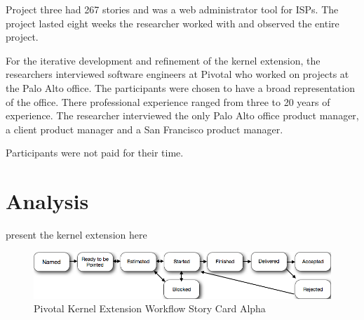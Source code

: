 \documentclass[preprint,12pt,3p]{elsarticle}
\begin{document}
Project three had 267 stories and was a web administrator tool for ISPs. The project lasted eight weeks the researcher worked with and observed the entire project.

For the iterative development and refinement of the kernel extension, the researchers interviewed software engineers at Pivotal who worked on projects at the Palo Alto office. The participants were chosen to have a broad representation of the office. There professional experience ranged from three to 20 years of experience. The researcher interviewed the only Palo Alto office product manager, a client product manager and a San Francisco product manager. 

Participants were not paid for their time. 

\section{Analysis}

present the kernel extension here
\begin{figure}[ht]
\includegraphics[width=6.25in]{pivotal_images/story_card_workflow}
\caption{Pivotal Kernel Extension Workflow Story Card Alpha}
\label{KernelExtensionWorkflow}
\end{figure}
\end{document}
